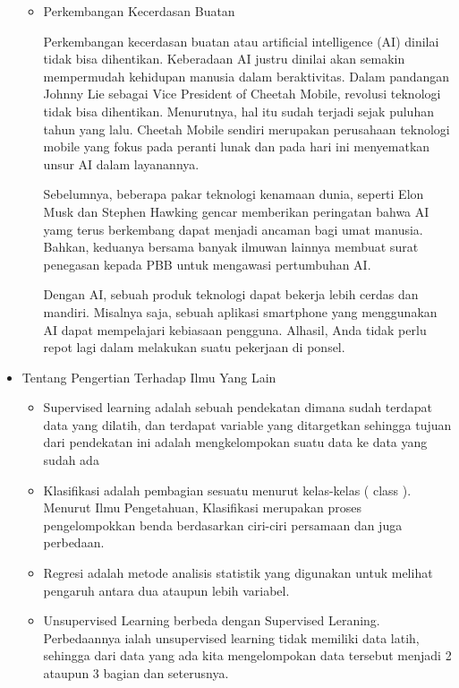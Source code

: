 \begin{itemize}
\begin{itemize}
\item Perkembangan Kecerdasan Buatan
\par Perkembangan kecerdasan buatan atau artificial intelligence (AI) dinilai tidak bisa dihentikan. Keberadaan AI justru dinilai akan semakin mempermudah kehidupan manusia dalam beraktivitas. Dalam pandangan Johnny Lie sebagai Vice President of Cheetah Mobile, revolusi teknologi tidak bisa dihentikan. Menurutnya, hal itu sudah terjadi sejak puluhan tahun yang lalu. Cheetah Mobile sendiri merupakan perusahaan teknologi mobile yang fokus pada peranti lunak dan pada hari ini menyematkan unsur AI dalam layanannya.
\par Sebelumnya, beberapa pakar teknologi kenamaan dunia, seperti Elon Musk dan Stephen Hawking gencar memberikan peringatan bahwa AI yamg terus berkembang dapat menjadi ancaman bagi umat manusia. Bahkan, keduanya bersama banyak ilmuwan lainnya membuat surat penegasan kepada PBB untuk mengawasi pertumbuhan AI.
\par Dengan AI, sebuah produk teknologi dapat bekerja lebih cerdas dan mandiri. Misalnya saja, sebuah aplikasi smartphone yang menggunakan AI dapat mempelajari kebiasaan pengguna. Alhasil, Anda tidak perlu repot lagi dalam melakukan suatu pekerjaan di ponsel.
\end{itemize}
\item Tentang Pengertian Terhadap Ilmu Yang Lain
\begin{itemize}
\item Supervised learning adalah sebuah pendekatan dimana sudah terdapat data yang dilatih, dan terdapat variable yang ditargetkan sehingga tujuan dari pendekatan ini adalah mengkelompokan suatu data ke data yang sudah ada
\par
\item Klasifikasi adalah pembagian sesuatu menurut kelas-kelas ( class ). Menurut Ilmu Pengetahuan, Klasifikasi merupakan proses pengelompokkan benda berdasarkan ciri-ciri persamaan dan juga perbedaan.
\par
\item Regresi adalah metode analisis statistik yang digunakan untuk melihat pengaruh antara dua ataupun lebih variabel.
\par
\item Unsupervised Learning berbeda dengan Supervised Leraning. Perbedaannya ialah unsupervised learning tidak memiliki data latih, sehingga dari data yang ada kita mengelompokan data tersebut menjadi 2  ataupun 3 bagian dan seterusnya.
\par

\end{itemize}
\end{itemize}
